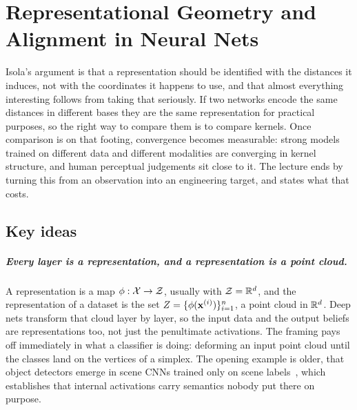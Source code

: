 \chapter{Representational Geometry and Alignment in Neural Nets}
\label{ch:02-representational-geometry}


Isola's argument is that a representation should be identified with the distances it induces,
not with the coordinates it happens to use, and that almost everything interesting follows
from taking that seriously. If two networks encode the same distances in different bases they
are the same representation for practical purposes, so the right way to compare them is to
compare kernels. Once comparison is on that footing, convergence becomes measurable:
strong models trained on different data and different modalities are converging in kernel
structure, and human perceptual judgements sit close to it. The lecture ends by turning this from an
observation into an engineering target, and states what that costs.

\section*{Key ideas}

\paragraph{Every layer is a representation, and a representation is a point cloud.} A
representation is a map $\phi : \mathcal{X} \to \mathcal{Z}$, usually with $\mathcal{Z} = \mathbb{R}^{d}$, and
the representation of a dataset is the set $Z = \{\phi(\mathbf{x}^{(i)})\}_{i=1}^{n}$, a point
cloud in $\mathbb{R}^{d}$. Deep nets transform that cloud layer by layer, so the input data and the
output beliefs are representations too, not just the penultimate activations. The framing
pays off immediately in what a classifier is doing: deforming an input point cloud until the
classes land on the vertices of a simplex. The opening example is older, that object
detectors emerge in scene CNNs trained only on scene labels~\citep{zhou2015}, which
establishes that internal activations carry semantics nobody put there on purpose.


